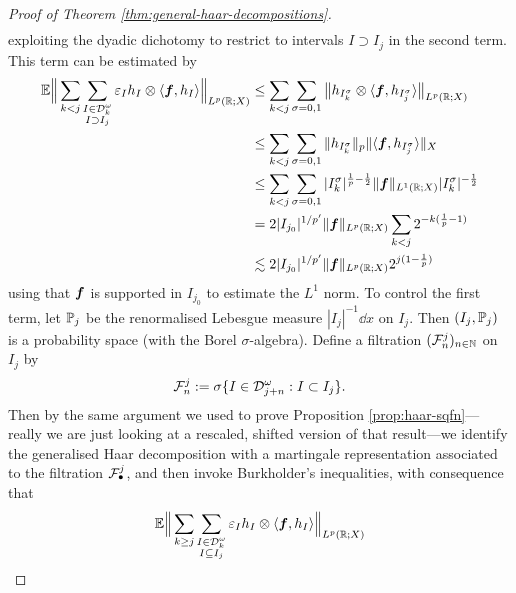 \begin{proof}[Proof of Theorem \ref{thm:general-haar-decompositions}]
\begin{equation*}
\begin{aligned}
    \end{aligned}
  \end{equation*}
  exploiting the dyadic dichotomy to restrict to intervals $I \supset I_{j}$ in the second term.
  This term can be estimated by
  \begin{equation*}
    \begin{aligned}
      \E \Big\| \sum_{k < j} \sum_{\substack{I \in \mc{D}_{k}^{\omega} \\ I \supset I_{j}}} \varepsilon_{I} h_{I} \otimes \langle \mb{f}, h_{I} \rangle \Big\|_{L^p(\R;X)}
      &\leq \sum_{k < j} \sum_{\sigma = 0,1} \big\| h_{I^{\sigma}_{k}} \otimes \langle \mb{f}, h_{I^{\sigma}_{j}} \rangle \big\|_{L^p(\R;X)} \\
      &\leq \sum_{k < j} \sum_{\sigma = 0,1} \|h_{I^{\sigma}_{k}}\|_{p} \| \langle \mb{f}, h_{I^{\sigma}_{j}} \rangle \|_{X} \\
      &\leq  \sum_{k < j} \sum_{\sigma = 0,1} |I_{k}^\sigma|^{\frac{1}{p}-\frac{1}{2}} \|\mb{f}\|_{L^1(\R;X)} |I_{k}^{\sigma}|^{-\frac{1}{2}} \\
      &= 2|I_{j_{0}}|^{1/p'} \|\mb{f}\|_{L^p(\R;X)} \sum_{k < j} 2^{-k(\frac{1}{p} - 1)} \\
      &\lesssim 2 |I_{j_{0}}|^{1/p'} \|\mb{f}\|_{L^p(\R;X)} 2^{j(1 - \frac{1}{p})}
    \end{aligned}
  \end{equation*}
  using that $\mb{f}$ is supported in $I_{j_{0}}$ to estimate the $L^1$ norm.
  To control the first term, let $\P_{j}$ be the renormalised Lebesgue measure $|I_{j}|^{-1} \dd x$ on $I_{j}$.
  Then $(I_{j},\P_{j})$ is a probability space (with the Borel $\sigma$-algebra).
  Define a filtration $(\mc{F}_{n}^{j})_{n \in \N}$ on $I_{j}$ by
  \begin{equation*}
    \mc{F}_{n}^{j} := \sigma\{I \in \mc{D}^{\omega}_{j+n} : I \subset I_{j}\}.
  \end{equation*} 
  Then by the same argument we used to prove Proposition \ref{prop:haar-sqfn}---really we are just looking at a rescaled, shifted version of that result---we identify the generalised Haar decomposition with a martingale representation associated to the filtration $\mc{F}^{j}_{\bullet}$, and then invoke Burkholder's inequalities, with consequence that
  \begin{equation*}
    \begin{aligned}
      \E \Big\| \sum_{k \geq j} \sum_{\substack{I \in \mc{D}_{k}^{\omega} \\ I \subseteq I_{j}}} \varepsilon_{I} h_{I} \otimes \langle \mb{f}, h_{I} \rangle \Big\|_{L^p(\R;X)}

\end{aligned}
\end{equation*}
\end{proof}
